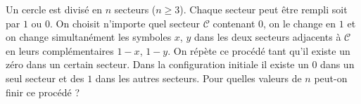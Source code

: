 \documentclass[varwidth]{standalone}
\begin{document}
    Un cercle est divis\'e en $n$ secteurs ($n \geq 3$). Chaque secteur peut \^etre rempli soit par $1$ ou $0$. On choisit n'importe quel secteur $\mathcal{C}$ contenant $0$, on le change en $1$ et on change simultan\'ement les symboles $x$, $y$ dans les deux secteurs adjacents \`a $\mathcal{C}$ en leurs compl\'ementaires $1 - x$, $1 - y$. On r\'ep\`ete ce proc\'ed\'e tant qu'il existe un z\'ero dans un certain secteur. Dans la configuration initiale il existe un $0$ dans un seul secteur et des $1$ dans les autres secteurs. Pour quelles valeurs de $n$ peut-on finir ce proc\'ed\'e ?
\end{document}
